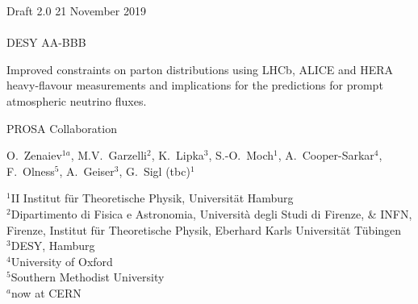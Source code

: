 \documentclass[12pt]{article}
\begin{document}
\begin{titlepage}
\noindent
Draft 2.0  \hfill 21 November 2019\\
\\
DESY AA-BBB %
\\

\vspace{1.0cm}

\begin{center}
  {\bf 

\large

Improved constraints on parton distributions using LHCb, ALICE and HERA heavy-flavour measurements and implications for the predictions for prompt atmospheric neutrino fluxes. 
  }
  \vspace{1.0cm}

  {\large
    PROSA Collaboration
  }\\

  \vspace{0.4cm}

\end{center}
\noindent
O.~Zenaiev$^{1a}$, \mbox{M.V.~Garzelli}$^{2}$, K.~Lipka$^{3}$, \mbox{S.-O.~Moch}$^{1}$, A.~Cooper-Sarkar$^{4}$, F.~Olness$^{5}$, A.~Geiser$^{3}$, G.~Sigl (tbc)$^{1}$\\


\noindent


{\footnotesize{
		\noindent
		$^{1}$II Institut f\"ur Theoretische Physik, Universit\"at Hamburg\\
		$^{2}$Dipartimento di Fisica e Astronomia, Universit\`a degli Studi di Firenze, \& INFN, Firenze, Institut f\"ur Theoretische Physik, Eberhard Karls Universit\"at T\"ubingen\\
		$^{3}${DESY, Hamburg}\\
		$^{4}$University of Oxford\\
		$^{5}$Southern Methodist University\\
		$^{a}$now at CERN\\
	}
}


\end{titlepage}
\end{document}
